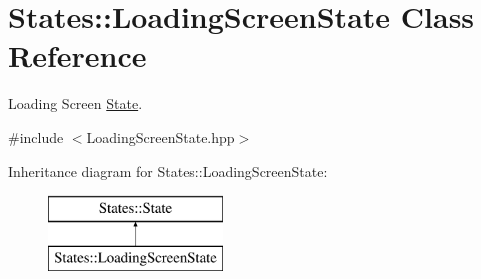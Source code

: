 \hypertarget{class_states_1_1_loading_screen_state}{}\section{States\+::Loading\+Screen\+State Class Reference}
\label{class_states_1_1_loading_screen_state}


Loading Screen \mbox{\hyperlink{class_states_1_1_state}{State}}.  




{\ttfamily \#include $<$Loading\+Screen\+State.\+hpp$>$}

Inheritance diagram for States\+::Loading\+Screen\+State\+:\begin{figure}[H]
\begin{center}
\leavevmode
\includegraphics[height=2.000000cm]{class_states_1_1_loading_screen_state}
\end{center}
\end{figure}
